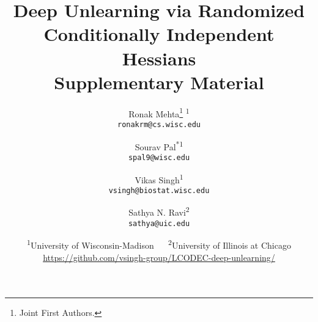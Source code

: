 \documentclass[letterpaper]{article} %
\date{}
\begin{document}
\title{Deep Unlearning via Randomized Conditionally Independent Hessians \\ 
Supplementary Material}
\author{Ronak Mehta\thanks{Joint First Authors.} \textsuperscript{\rm 1}\\
{\tt\small ronakrm@cs.wisc.edu}
\and
Sourav Pal\textsuperscript{*\rm 1}\\
{\tt\small spal9@wisc.edu}
\and
Vikas Singh\textsuperscript{\rm 1} \\
{\tt\small vsingh@biostat.wisc.edu}
\and
Sathya N. Ravi\textsuperscript{\rm 2} \\
{\tt\small sathya@uic.edu}
\and
{\textsuperscript{\rm 1}University of Wisconsin-Madison $\quad$
\textsuperscript{\rm 2}University of Illinois at Chicago} \\
\mbox{\url{https://github.com/vsingh-group/LCODEC-deep-unlearning/}}
}

\maketitle

\tableofcontents






\clearpage

{


}
\end{document}
